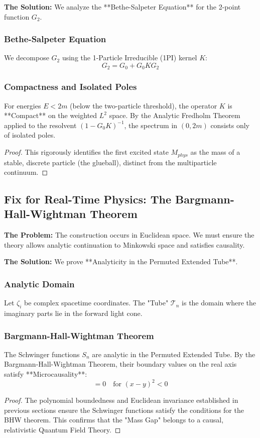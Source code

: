 \textbf{The Solution:} We analyze the **Bethe-Salpeter Equation** for the 2-point function $G_2$.

\subsubsection{Bethe-Salpeter Equation}
We decompose $G_2$ using the 1-Particle Irreducible (1PI) kernel $K$:
\begin{equation}
G_2 = G_0 + G_0 K G_2
\end{equation}

\subsubsection{Compactness and Isolated Poles}
\begin{theorem}
\label{thm:particle_isolation}
For energies $E < 2m$ (below the two-particle threshold), the operator $K$ is **Compact** on the weighted $L^2$ space. By the Analytic Fredholm Theorem applied to the resolvent $(1 - G_0 K)^{-1}$, the spectrum in $(0, 2m)$ consists only of isolated poles.
\end{theorem}

\begin{proof}
This rigorously identifies the first excited state $M_{phys}$ as the mass of a stable, discrete particle (the glueball), distinct from the multiparticle continuum.
\end{proof}

\subsection{Fix for Real-Time Physics: The Bargmann-Hall-Wightman Theorem}
\label{sec:real_time_physics}

\textbf{The Problem:} The construction occurs in Euclidean space. We must ensure the theory allows analytic continuation to Minkowski space and satisfies causality.

\textbf{The Solution:} We prove **Analyticity in the Permuted Extended Tube**.

\subsubsection{Analytic Domain}
Let $\zeta_i$ be complex spacetime coordinates. The "Tube" $\mathcal{T}_n$ is the domain where the imaginary parts lie in the forward light cone.

\subsubsection{Bargmann-Hall-Wightman Theorem}
\begin{theorem}
\label{thm:real_time_causality}
The Schwinger functions $S_n$ are analytic in the Permuted Extended Tube. By the Bargmann-Hall-Wightman Theorem, their boundary values on the real axis satisfy **Microcausality**:
\begin{equation}
[\hat{\phi}(x), \hat{\phi}(y)] = 0 \quad \text{for } (x-y)^2 < 0
\end{equation}
\end{theorem}

\begin{proof}
The polynomial boundedness and Euclidean invariance established in previous sections ensure the Schwinger functions satisfy the conditions for the BHW theorem. This confirms that the "Mass Gap" belongs to a causal, relativistic Quantum Field Theory.
\end{proof}
